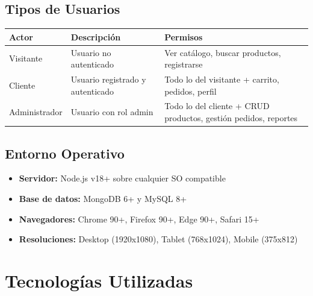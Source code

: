 \documentclass[12pt,a4paper]{article}
\begin{document}
\subsection{Tipos de Usuarios}
\begin{table}[H]
\centering
\begin{tabularx}{\textwidth}{lXX}
\toprule
\textbf{Actor} & \textbf{Descripci\'on} & \textbf{Permisos} \\
\midrule
Visitante & Usuario no autenticado & Ver cat\'alogo, buscar productos, registrarse \\
Cliente & Usuario registrado y autenticado & Todo lo del visitante + carrito, pedidos, perfil \\
Administrador & Usuario con rol admin & Todo lo del cliente + CRUD productos, gesti\'on pedidos, reportes \\
\bottomrule
\end{tabularx}
\end{table}

\subsection{Entorno Operativo}
\begin{itemize}
    \item \textbf{Servidor:} Node.js v18+ sobre cualquier SO compatible
    \item \textbf{Base de datos:} MongoDB 6+ y MySQL 8+
    \item \textbf{Navegadores:} Chrome 90+, Firefox 90+, Edge 90+, Safari 15+
    \item \textbf{Resoluciones:} Desktop (1920x1080), Tablet (768x1024), Mobile (375x812)
\end{itemize}

\newpage
\section{Tecnolog\'ias Utilizadas}
\end{document}
